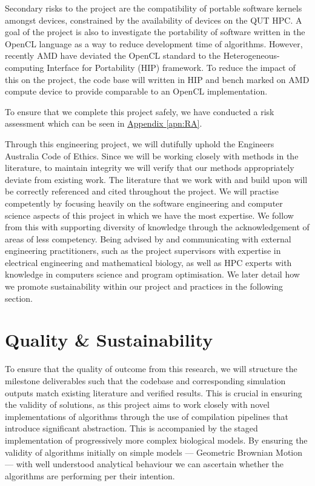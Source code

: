 \documentclass[11pt, a4paper]{article}
\newcommand{\refapn}[1]{\hyperref[#1]{Appendix \ref{#1}}}
\begin{document}
	Secondary risks to the project are the compatibility of portable software kernels amongst devices, constrained by the availability of devices on the QUT HPC. A goal of the project is also to investigate the portability of software written in the OpenCL language as a way to reduce development time of algorithms. However, recently AMD have deviated the OpenCL standard to the Heterogeneous-computing Interface for Portability (HIP) framework. To reduce the impact of this on the project, the code base will written in HIP and bench marked on AMD compute device to provide comparable to an OpenCL implementation. 
	
	To ensure that we complete this project safely, we have conducted a risk assessment which can be seen in \refapn{apn:RA}.

	Through this engineering project, we will dutifully uphold the Engineers Australia Code of Ethics. Since we will be working closely with methods in the literature, to maintain integrity we will verify that our methods appropriately deviate from existing work. The literature that we work with and build upon will be correctly referenced and cited throughout the project. We will practise competently by focusing heavily on the software engineering and computer science aspects of this project in which we have the most expertise. We follow from this with supporting diversity of knowledge through the acknowledgement of areas of less competency. Being advised by and communicating with external engineering practitioners, such as the project supervisors with expertise in electrical engineering and mathematical biology, as well as HPC experts with knowledge in computers science and program optimisation. We later detail how we promote sustainability within our project and practices in the following section.  
	
	\section{Quality \& Sustainability}
	To ensure that the quality of outcome from this research, we will structure the milestone deliverables such that the codebase and corresponding simulation outputs match existing literature and verified results. This is crucial in ensuring the validity of solutions, as this project aims to work closely with novel implementations of algorithms through the use of compilation pipelines that introduce significant abstraction. This is accompanied by the staged implementation of progressively more complex biological models. By ensuring the validity of algorithms initially on simple models --- Geometric Brownian Motion \cite{haasNestedMLMCFramework2025} --- with well understood analytical behaviour we can ascertain whether the algorithms are performing per their intention.
	
\end{document}
